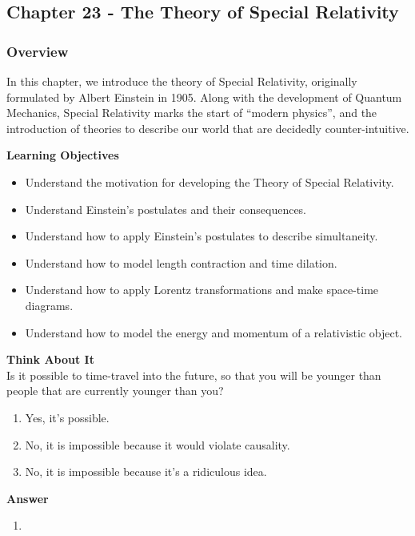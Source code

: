 \subsection{Chapter 23 - The Theory of Special Relativity}

\subsubsection{Overview}\label{chap:specialrelativity}

In this chapter, we introduce the theory of Special Relativity, originally formulated by Albert Einstein in 1905. Along with the development of Quantum Mechanics, Special Relativity marks the start of ``modern physics'', and the introduction of theories to describe our world that are decidedly counter-intuitive.

\begin{framed}
\textbf{Learning Objectives}\\
\begin{itemize}
\item Understand the motivation for developing the Theory of Special Relativity.
\item Understand Einstein's postulates and their consequences.
\item Understand how to apply Einstein's postulates to describe simultaneity.
\item Understand how to model length contraction and time dilation.
\item Understand how to apply Lorentz transformations and make space-time diagrams.
\item Understand how to model the energy and momentum of a relativistic object.
\end{itemize}
\end{framed}

\begin{framed}
\textbf{Think About It}\\
Is it possible to time-travel into the future, so that you will be younger than people that are currently younger than you?

\begin{enumerate}
\item Yes, it's possible.
\item No, it is impossible because it would violate causality.
\item No, it is impossible because it's a ridiculous idea.
\end{enumerate}

\begin{framed}
\textbf{Answer}\\
\begin{enumerate}
\item
\end{enumerate}
\end{framed}
\end{framed}

